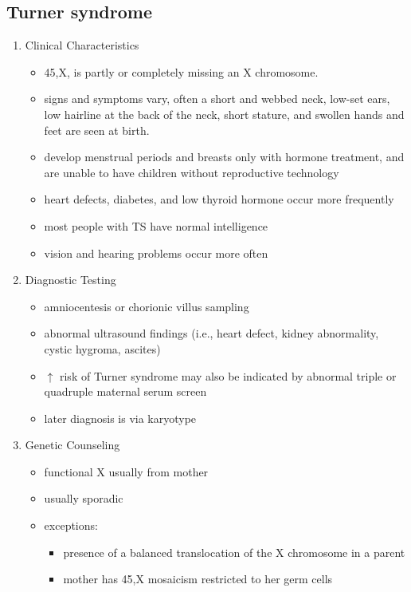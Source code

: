 \documentclass[12pt]{scrartcl}
\begin{document}
\subsection{Turner syndrome}
\label{sec:orgb398fd4}
\begin{enumerate}
\item Clinical Characteristics
\label{sec:orga857a3d}
\begin{itemize}
\item 45,X, \female is partly or completely missing an X chromosome.
\item signs and symptoms vary, often a short and webbed neck, low-set
ears, low hairline at the back of the neck, short stature, and
swollen hands and feet are seen at birth.
\item develop menstrual periods and breasts only with hormone treatment,
and are unable to have children without reproductive technology
\item heart defects, diabetes, and low thyroid hormone occur more
frequently
\item most people with TS have normal intelligence
\item vision and hearing problems occur more often
\end{itemize}
\item Diagnostic Testing
\label{sec:orgbc5fd87}
\begin{itemize}
\item amniocentesis or chorionic villus sampling
\item abnormal ultrasound findings (i.e., heart defect, kidney
abnormality, cystic hygroma, ascites)
\item \(\uparrow\) risk of Turner syndrome may also be indicated by abnormal
triple or quadruple maternal serum screen
\item later diagnosis is via karyotype
\end{itemize}
\item Genetic Counseling
\label{sec:orgafd70a4}
\begin{itemize}
\item functional X usually from mother
\item usually sporadic
\item exceptions:
\begin{itemize}
\item presence of a balanced translocation of the X chromosome in a parent
\item mother has 45,X mosaicism restricted to her germ cells
\end{itemize}
\end{itemize}
\end{enumerate}
\end{document}
